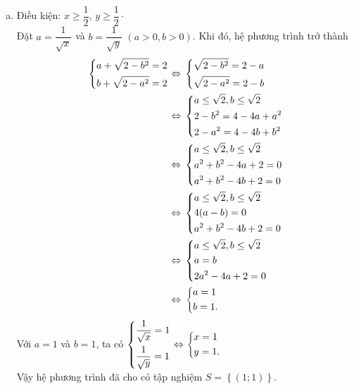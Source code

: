 \begin{ex}
{\begin{enumerate}[a)]
$$        			$$
        			Vậy hệ phương trình đã cho có tập nghiệm $S = \left\lbrace (3; 4), (4; 3), (-3; -4), (-4; -3) \right\rbrace$.
			\item Điều kiện: $x \geq \dfrac{1}{2}$, $y \geq \dfrac{1}{2}\cdot$\\
					Đặt $a = \dfrac{1}{\sqrt{x}}$ và $b = \dfrac{1}{\sqrt{y}}$ $(a > 0, b > 0)$. Khi đó, hệ phương trình trở thành
					$$
        			\begin{aligned}
        				\left\{\begin{aligned}&a + \sqrt{2 - b^2} = 2 \\&b + \sqrt{2 - a^2} = 2\end{aligned}\right. &\Leftrightarrow\, \left\{\begin{aligned}&\sqrt{2 - b^2} = 2 - a \\&\sqrt{2 - a^2} = 2 - b\end{aligned}\right.\\
        				&\Leftrightarrow\,\left\{\begin{aligned}&a \leq \sqrt{2}, b \leq \sqrt{2} \\&2 - b^2 = 4 - 4a + a^2 \\&2 - a^2 = 4 - 4b + b^2\end{aligned}\right.\\
        				&\Leftrightarrow\,\left\{\begin{aligned}&a \leq \sqrt{2}, b \leq \sqrt{2} \\&a^2 + b^2 - 4a + 2 = 0 \\&a^2 + b^2 - 4b + 2 = 0\end{aligned}\right.\\
        				&\Leftrightarrow\,\left\{\begin{aligned}&a \leq \sqrt{2}, b \leq \sqrt{2} \\&4(a - b) = 0 \\&a^2 + b^2 - 4b + 2 = 0\end{aligned}\right.\\
        				&\Leftrightarrow\,\left\{\begin{aligned}&a \leq \sqrt{2}, b \leq \sqrt{2} \\&a = b \\&2a^2 - 4a + 2 = 0\end{aligned}\right.\\
        				&\Leftrightarrow\,\left\{\begin{aligned}&a = 1 \\&b = 1.\end{aligned}\right.	
        			\end{aligned}\\
        			$$
        			Với $a = 1$ và $b = 1$, ta có $\left\{\begin{aligned}&\dfrac{1}{\sqrt{x}} = 1 \\&\dfrac{1}{\sqrt{y}} = 1\end{aligned}\right. \Leftrightarrow \left\{\begin{aligned}&x = 1 \\&y = 1.\end{aligned}\right.$\\
        			Vậy hệ phương trình đã cho có tập nghiệm $S = \left\lbrace (1; 1) \right\rbrace$.
		\end{enumerate}   
    }
\end{ex}

